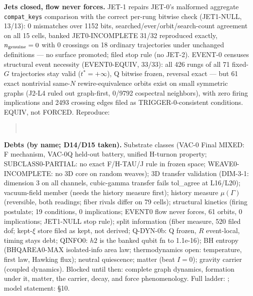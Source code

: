 \documentclass[11pt]{article}
\begin{document}
\textbf{Jets closed, flow never forces.} JET-1 repairs JET-0's
malformed aggregate \texttt{compat\_keys} comparison with the correct
per-rung bitwise check (JET1-NULL, 13/13): 0 mismatches over 1152
bits, searched/ever/orbit/search-count agreement on all 15 cells,
banked JET0-INCOMPLETE 31/32 reproduced exactly, $n_{\rm genuine} = 0$
with 0 crossings on 18 ordinary trajectories under unchanged
definitions --- no surface promoted; filed stop rule (no JET-2).
EVENT-0 censuses structural event necessity (EVENT0-EQUIV, 33/33):
all 426 rungs of all 71 fixed-$G$ trajectories stay valid ($t^* =
+\infty$), Q bitwise frozen, reversal exact --- but 61 exact
nontrivial same-$N$ rewire-equivalence orbits exist on small
symmetric graphs (J2-L4 ruled out graph-first, 0/9792 cospectral
neighbors), with zero firing implications and 2493 crossing edges
filed as TRIGGER-0-consistent conditions. EQUIV, not FORCED.
Reproduce:
\begin{quote}\small
{}\\
\end{quote}

\textbf{Debts (by name; D14/D15 taken).} Substrate classes (VAC-0 Final
MIXED: F mechanism, VAC-0Q held-out battery, unified H-turnon property;
SUBCLASS0-PARTIAL: no exact F/H-TAU/J rule in frozen space;
WEAVE0-INCOMPLETE: no 3D core on random weaves);
3D transfer validation (DIM-3-1: dimension 3 on all channels, cubic-gamma
transfer fails tol\_agree at L16/L20);
vacuum-field member (needs the history measure first); history measure
$\mu(\Gamma)$ (reversible, both readings; fiber rivals differ on 79 cells);
structural kinetics (firing postulate; 19 conditions, 0 implications;
EVENT0 flow never forces, 61 orbits, 0 implications; JET1-NULL stop rule);
split information (fiber measure, 520 filed dof; kept-$\xi$ store filed as
kept, not derived; Q-DYN-0b: Q frozen, $R$ event-local, timing stays debt;
QINFO0: $h2$ is the banked qubit fn to 1.1e-16);
BH entropy (BHQAREA0-MAX isolated-info area law; thermodynamics open:
temperature, first law, Hawking flux);
neutral quiescence;
matter (beat $I = 0$); gravity carrier (coupled dynamics). Blocked until then: complete graph
dynamics, formation under it, matter, the carrier, decay, and force
phenomenology. Full ladder: ;
model statement:  \S10.
\end{document}
